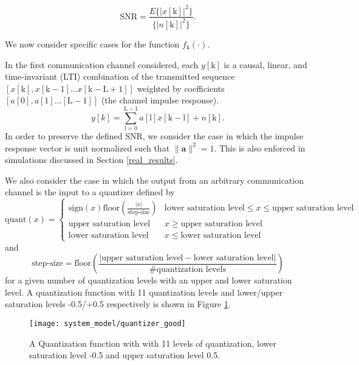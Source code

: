 \begin{equation*}
\text{SNR} = \frac{E\{|x[\text{k}]|^2\}}{\{|n[\text{k}]|^2\}}.
\end{equation*}
\par
We now consider specific cases for the function $f_{\text{k}}(\cdot)$. \par
In the first communication channel considered, each $y[\text{k}]$ is a causal, linear, and time-invariant (LTI) combination of the transmitted sequence $[x[\text{k}], x[\text{k}-1]... x[\text{k}-\text{L}+1]]$ weighted by coefficients $[a[0], a[1].. . [\text{L}-1]]$ (the channel impulse response). 
\begin{equation}\label{lti_channel}
y[k] = \sum_{\mathrm{\text{l}=0}}^{\mathrm{\text{L}-1}} a[\text{l}]x[\text{k}-\text{l}]+ n[\text{k}].
\end{equation}
In order to preserve the defined SNR, we consider the case in which the impulse response vector is unit normalized such that $\|\mathbf{a}\|^2 =1 $. This is also enforced in simulations discussed in Section \ref{real_results}.
\par
We also consider the case in which the output from an arbitrary communication channel is the input to a quantizer defined by 
\[\text{quant}(x) = 
\begin{cases}
\text{sign}(x)\text{floor}\left(\frac{|x|}{\text{step-size}}\right)& \text{lower saturation level} \leq x \leq \text{upper saturation level}\\
\text{upper saturation level} & x \geq \text{upper saturation level}\\
\text{lower saturation level} & x \leq \text{lower saturation level}
\end{cases}
\]
 and  
 \begin{equation*}
  \text{step-size} =\text{floor}\left(\frac{|\text{upper saturation level}- \text{lower saturation level}|}{\text{\#quantization levels}}\right)
 \end{equation*} for a given number of quantization levels with an upper and lower saturation level. A quantization function with 11 quantization levels and lower/upper saturation levels -0.5/+0.5 respectively is shown in Figure \ref{fig:Quantized Overlay}. 
  \begin{figure}[H]
\centering
	\texttt{[image: system\_model/quantizer\_good]}
			  \caption{A Quantization function with with 11 levels of quantization, lower saturation level -0.5 and upper saturation level 0.5. }
	  \label{fig:Quantized Overlay}
\end{figure}
 
